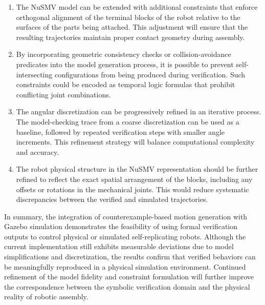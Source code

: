 \begin{enumerate}
    \item The NuSMV model can be extended with additional constraints that 
    enforce orthogonal alignment of the terminal blocks of the robot relative 
    to the surfaces of the parts being attached. 
    This adjustment will ensure that the resulting trajectories maintain proper 
    contact geometry during assembly.
    
    \item By incorporating geometric consistency checks or collision-avoidance predicates 
        into the model generation process, 
    it is possible to prevent self-intersecting configurations from being 
    produced during verification. 
    Such constraints could be encoded as temporal logic formulas that prohibit 
    conflicting joint combinations.
    
    \item The angular discretization can be progressively refined in an iterative process. 
    The model-checking trace from a coarse discretization can be used as a 
    baseline, followed by repeated verification steps with smaller angle 
    increments. 
    This refinement strategy will balance computational complexity and accuracy.
    
    \item 
    The robot physical structure in the NuSMV representation should be further refined 
    to reflect the exact spatial arrangement of the blocks, 
    including any offsets or rotations in the mechanical joints. 
    This would reduce systematic discrepancies between the verified and simulated trajectories.
\end{enumerate}

In summary, the integration of counterexample-based motion generation with 
Gazebo simulation demonstrates the feasibility of using formal verification outputs 
to control physical or simulated self-replicating robots. 
Although the current implementation still exhibits measurable deviations due 
to model simplifications and discretization, 
the results confirm that verified behaviors can be meaningfully reproduced 
in a physical simulation environment. 
Continued refinement of the model fidelity and constraint formulation will 
further improve the correspondence between the symbolic verification domain 
and the physical reality of robotic assembly.



